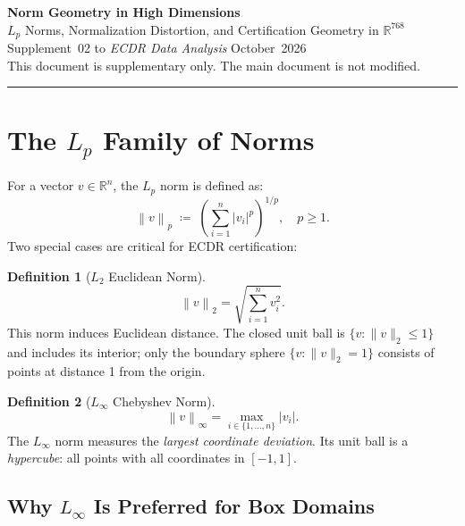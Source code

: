 \documentclass[11pt, a4paper]{article}
\theoremstyle{definition}
\newtheorem{definition}{Definition}[section]
\theoremstyle{plain}
\newcommand{\R}{\mathbb{R}}
\newcommand{\norm}[2]{\left\|#1\right\|_{#2}}
\begin{document}
\begin{center}
  {\LARGE\bfseries\color{teal} Norm Geometry in High Dimensions}\\[0.5em]
  {\large\color{muted} $L_p$ Norms, Normalization Distortion, and Certification Geometry in $\R^{768}$}\\[1.2em]
  {\normalsize Supplement~02 to \textit{ECDR Data Analysis} \textbar{} October~2026}\\[0.3em]
  {\small\color{muted} This document is supplementary only. The main document is not modified.}
\end{center}

\vspace{1em}\hrule\vspace{1em}

\tableofcontents
\clearpage

\section{The $L_p$ Family of Norms}

For a vector $v \in \R^n$, the $L_p$ norm is defined as:
\begin{equation}
  \norm{v}{p} \;\coloneqq\; \left(\sum_{i=1}^n |v_i|^p\right)^{1/p}, \quad p \ge 1.
\end{equation}
Two special cases are critical for ECDR certification:

\begin{definition}[$L_2$ Euclidean Norm]
  \[
    \norm{v}{2} = \sqrt{\sum_{i=1}^n v_i^2}.
  \]
  This norm induces Euclidean distance. The closed unit ball is $\{v:\|v\|_2\le1\}$ and includes its interior; only the boundary sphere $\{v:\|v\|_2=1\}$ consists of points at distance 1 from the origin.
\end{definition}

\begin{definition}[$L_\infty$ Chebyshev Norm]
  \[
    \norm{v}{\infty} = \max_{i \in \{1,\ldots,n\}} |v_i|.
  \]
  The $L_\infty$ norm measures the \emph{largest coordinate deviation}.
  Its unit ball is a \emph{hypercube}: all points with all coordinates in $[-1, 1]$.
\end{definition}

\subsection{Why $L_\infty$ Is Preferred for Box Domains}
\end{document}
